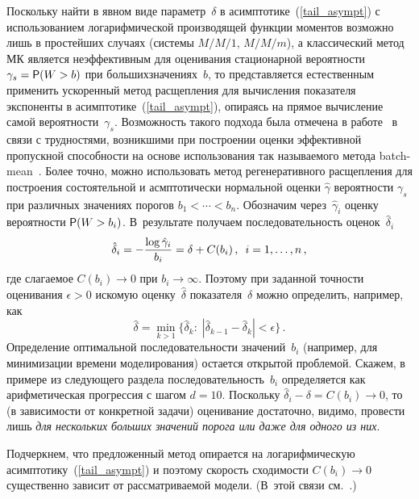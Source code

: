 \begin{multicols}{2}
Поскольку найти в явном виде параметр~$\delta$ в  асимптотике~(\ref{tail_asympt}) 
с использованием логарифмической производящей
функции моментов возможно лишь в простейших случаях (системы\linebreak
$M/M/1,\,M/M/m$), а классический метод МК  является неэффективным
для оценивания стационарной ве\-ро\-ят\-ности $\gamma_s={\sf P}(W
> b)$ при больших\linebreak значениях~$b$, то представляется естественным
применить ускоренный метод  расщепления
 для
вы\-чис\-ле\-ния показателя экспоненты в асимптотике~(\ref{tail_asympt}),
опираясь на прямое вычисление самой ве\-ро\-ят\-ности~$\gamma_s$.
Возможность такого подхода была отмечена   в работе~\cite{BDM} в
связи с трудностями, возникшими при  построении оценки эффективной
пропускной способности на основе использования так называемого
метода batch-mean~\cite{natalie}.  Более точно,  можно использовать
метод регенеративного расщепления для построения состоятельной и
асмптотически нормальной оценки $ \hat\gamma$ вероятности $\gamma_s$
при различных значениях порогов $b_1 <  \cdots < b_n$. Обозначим
через~$\hat\gamma_i$ оценку вероятности ${\sf P} (W > b_i)$. В~результате
получаем последовательность
 оценок~$\hat\delta_i$
\begin{equation}
\hat\delta_i = - \displaystyle\frac{\displaystyle \log \hat\gamma_i\mathstrut}{\displaystyle b_i\mathstrut} = \delta + C(b_i)\,,\enskip
i= 1,\ldots, n\,, 
\label{hat_delta_i}
\end{equation}
где слагаемое $C(b_i)\to 0$ при $b_i \to \infty$. Поэтому при
заданной точности оценивания $\epsilon > 0$
искомую  оценку~$\hat\delta$  показателя~$\delta$ можно определить,
например, как
\begin{equation}
\hat\delta = \min_{k > 1} \{\hat\delta_k: \; |\hat\delta_{k-1} -
\hat\delta_k| < \epsilon \}\,. 
\label{hat_delta}
\end{equation}
Определение оптимальной последовательности значений~$b_i$ (например,
для минимизации  времени моделирования) остается открытой проблемой.
Скажем, в примере из следующего раздела  последовательность~$b_i$
определяется  как арифметическая прогрессия с шагом $d=10$.
Поскольку  $\hat \delta_i-\delta=C(b_i)\to 0$, то (в зависимости  от
конкретной задачи) оценивание достаточно, видимо, провести  лишь
{\it для нескольких больших значений порога  или даже для одного из
них}.

Подчеркнем, что предложенный метод опирается на логарифмическую
асимптотику~(\ref{tail_asympt}) и  поэтому   скорость сходимости
$C(b_i)\to 0$ существенно зависит  от рассматриваемой модели. 
(В~этой связи см.~\cite{Morozov-asymptotics}.)


\end{multicols}
